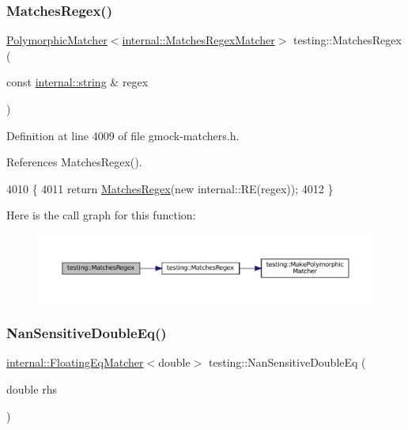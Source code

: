 \subsubsection{\texorpdfstring{Matches\+Regex()}{MatchesRegex()}\hspace{0.1cm}{\footnotesize\ttfamily [2/2]}}
{\footnotesize\ttfamily \hyperlink{classtesting_1_1PolymorphicMatcher}{Polymorphic\+Matcher}$<$\hyperlink{classtesting_1_1internal_1_1MatchesRegexMatcher}{internal\+::\+Matches\+Regex\+Matcher}$>$ testing\+::\+Matches\+Regex (\begin{DoxyParamCaption}\item[{const \hyperlink{namespacetesting_1_1internal_a8e8ff5b11e64078831112677156cb111}{internal\+::string} \&}]{regex }\end{DoxyParamCaption})\hspace{0.3cm}{\ttfamily [inline]}}



Definition at line 4009 of file gmock-\/matchers.\+h.



References Matches\+Regex().


\begin{DoxyCode}
4010                                  \{
4011   \textcolor{keywordflow}{return} \hyperlink{namespacetesting_afea6e0eaf0ae69b409fc1c0285df6c8c}{MatchesRegex}(\textcolor{keyword}{new} internal::RE(regex));
4012 \}
\end{DoxyCode}
Here is the call graph for this function\+:
\nopagebreak
\begin{figure}[H]
\begin{center}
\leavevmode
\includegraphics[width=350pt]{namespacetesting_afea6e0eaf0ae69b409fc1c0285df6c8c_cgraph}
\end{center}
\end{figure}
\mbox{\label{namespacetesting_aa83ee35256fd90033f615ef640245525}} 
\subsubsection{\texorpdfstring{Nan\+Sensitive\+Double\+Eq()}{NanSensitiveDoubleEq()}}
{\footnotesize\ttfamily \hyperlink{classtesting_1_1internal_1_1FloatingEqMatcher}{internal\+::\+Floating\+Eq\+Matcher}$<$double$>$ testing\+::\+Nan\+Sensitive\+Double\+Eq (\begin{DoxyParamCaption}\item[{double}]{rhs }\end{DoxyParamCaption})\hspace{0.3cm}{\ttfamily [inline]}}




